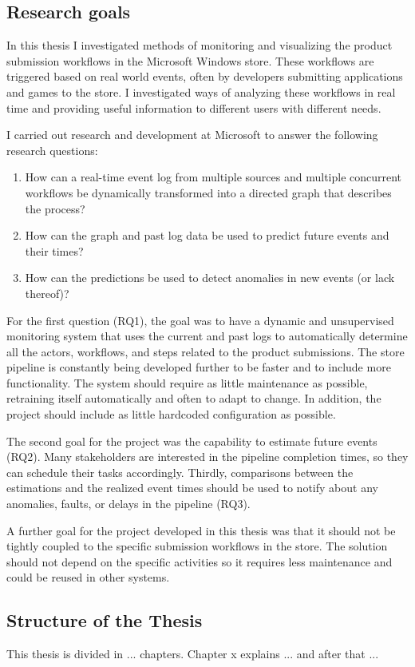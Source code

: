 \subsection{Research goals}
In this thesis I investigated methods of monitoring and visualizing the product submission workflows in the Microsoft Windows store.
These workflows are triggered based on real world events, often by developers submitting applications and games to the store.
I investigated ways of analyzing these workflows in real time and providing useful information to different users with different needs. 

I carried out research and development at Microsoft to answer the following research questions:

\begin{enumerate}[label=RQ\arabic*]
    \item How can a real-time event log from multiple sources and multiple concurrent workflows be dynamically transformed into a directed graph that describes the process? 
    \item How can the graph and past log data be used to predict future events and their times?
    \item How can the predictions be used to detect anomalies in new events (or lack thereof)?
\end{enumerate}

For the first question (RQ1), the goal was to have a dynamic and unsupervised monitoring system 
that uses the current and past logs to automatically determine all the actors, 
workflows, and steps related to the product submissions.
The store pipeline is constantly being developed further to be faster and to include more functionality.
The system should require as little maintenance as possible, retraining itself automatically and often to adapt to change.
In addition, the project should include as little hardcoded configuration as possible.

The second goal for the project was the capability to estimate future events (RQ2). 
Many stakeholders are interested in the pipeline completion times, so they can schedule their tasks accordingly.
Thirdly, comparisons between the estimations and the realized event times should be used to notify 
about any anomalies, faults, or delays in the pipeline (RQ3).

A further goal for the project developed in this thesis was that it should not be tightly coupled to the 
specific submission workflows in the store. The solution should not depend on the specific activities so
it requires less maintenance and could be reused in other systems.

\subsection{Structure of the Thesis}
This thesis is divided in ... chapters. Chapter x explains ... and after that ... 
